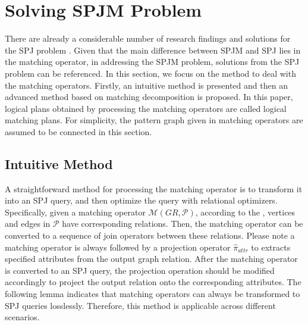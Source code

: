 \section{Solving SPJM Problem}
\label{sec:solve-spjm-problem}
There are already a considerable number of research findings and solutions for the SPJ problem \cite{}.
Given that the main difference between SPJM and SPJ lies in the matching operator, in addressing the SPJM problem, solutions from the SPJ problem can be referenced.
In this section, we focus on the method to deal with the matching operators.
Firstly, an intuitive method is presented and then an advanced method based on matching decomposition is proposed.
In this paper, logical plans obtained by processing the matching operators are called logical matching plans.
For simplicity, the pattern graph given in matching operators are assumed to be connected in this section.

\subsection{Intuitive Method}
\label{sec:intuitive-method}
A straightforward method for processing the matching operator is to transform it into an SPJ query, and then optimize the query with relational optimizers.
Specifically, given a matching operator $\mathcal{M}(GR, \mathcal{P})$, according to the \rgmapping, vertices and edges in $\mathcal{P}$ have corresponding relations.
Then, the matching operator can be converted to a sequence of join operators between these relations.
Please note a matching operator is always followed by a projection operator $\widehat{\pi}_{attr}$ to extracts specified attributes from the output graph relation.
After the matching operator is converted to an SPJ query, the projection operation should be modified accordingly to project the output relation onto the corresponding attributes.
The following lemma indicates that matching operators can always be transformed to SPJ queries losslessly.
Therefore, this method is applicable across different scenarios.


